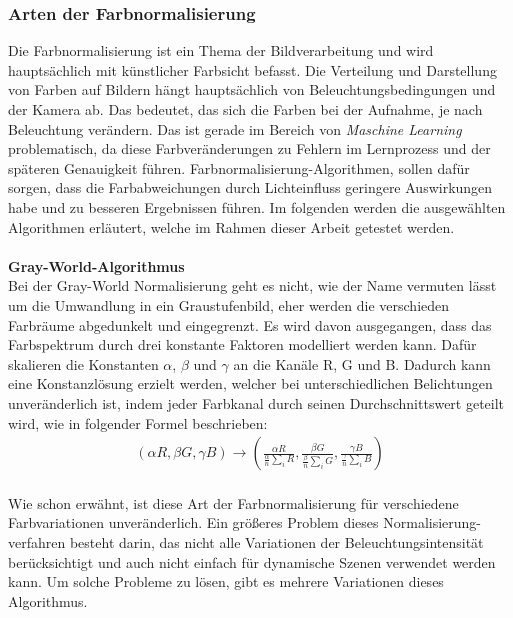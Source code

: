 \documentclass[a4paper,12pt,oneside]{article}
\begin{document}
\subsubsection{Arten der Farbnormalisierung}\label{s.farbnormalisierungen}
Die Farbnormalisierung ist ein Thema der Bildverarbeitung und wird hauptsächlich mit künstlicher Farbsicht befasst. Die Verteilung und Darstellung von Farben auf Bildern hängt hauptsächlich von Beleuchtungsbedingungen und der Kamera ab. Das bedeutet, das sich die Farben bei der Aufnahme, je nach Beleuchtung verändern. Das ist gerade im Bereich von \textit{Maschine Learning} problematisch, da diese Farbveränderungen zu Fehlern im Lernprozess und der späteren Genauigkeit führen. Farbnormalisierung-Algorithmen, sollen dafür sorgen, dass die Farbabweichungen durch Lichteinfluss geringere Auswirkungen habe und zu besseren Ergebnissen führen. Im folgenden werden die ausgewählten Algorithmen erläutert, welche im Rahmen dieser Arbeit getestet werden.\\\\
  \textbf{Gray-World-Algorithmus}\label{s.gw}\\
  Bei der Gray-World Normalisierung geht es nicht, wie der Name vermuten lässt um die Umwandlung in ein Graustufenbild, eher werden die verschieden Farbräume abgedunkelt und eingegrenzt. Es wird davon ausgegangen, dass das Farbspektrum durch drei konstante Faktoren modelliert werden kann. Dafür skalieren die Konstanten $\alpha$, $\beta$ und $\gamma$ an die Kanäle R, G und B. Dadurch kann eine Konstanzlösung erzielt werden, welcher bei unterschiedlichen Belichtungen unveränderlich ist, indem jeder Farbkanal durch seinen Durchschnittswert geteilt wird, wie in folgender Formel beschrieben:\\
  \begin{eqnarray} (\alpha R, \beta G, \gamma B) \rightarrow\left(\frac{\alpha R} {\frac{\alpha}{n} \sum_{i} R}, \frac{\beta G} {\frac{\beta}{n} \sum_{i} G}, \frac{\gamma B} {\frac{\gamma}{n} \sum_{i} B} \right) \end{eqnarray}\\
  Wie schon erwähnt, ist diese Art der Farbnormalisierung für verschiedene Farbvariationen unveränderlich. Ein größeres Problem dieses Normalisierung-verfahren besteht darin, das nicht alle Variationen der Beleuchtungsintensität berücksichtigt und auch nicht einfach für dynamische Szenen verwendet werden kann. Um solche Probleme zu lösen, gibt es mehrere Variationen dieses Algorithmus.\\\\
\end{document}
